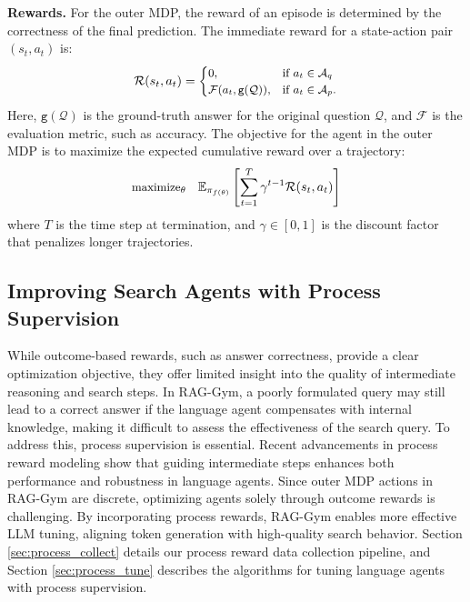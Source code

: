 \noindent \textbf{Rewards.} For the outer MDP, the reward of an episode is determined by the correctness of the final prediction. The immediate reward for a state-action pair \((s_t, a_t)\) is:
\begin{equation}\small
\mathcal{R}(s_t, a_t) = \begin{cases} 
0, & \text{if } a_t \in \mathcal{A}_q \\ 
\mathcal{F}(a_t, \mathtt{g}(\mathcal{Q})), & \text{if } a_t \in \mathcal{A}_p.
\end{cases}
\end{equation}
Here, \(\mathtt{g}(\mathcal{Q})\) is the ground-truth answer for the original question \(\mathcal{Q}\), and \(\mathcal{F}\) is the evaluation metric, such as accuracy.
The objective for the agent in the outer MDP is to maximize the expected cumulative reward over a trajectory:
\begin{equation}\small
\text{maximize}_{\theta} \quad \mathbb{E}_{\pi_{f(\theta)}}\left[\sum_{t=1}^{T} \gamma^{t-1}\mathcal{R}(s_t, a_t)\right]
\end{equation}
where \(T\) is the time step at termination, and \(\gamma \in [0, 1]\) is the discount factor that penalizes longer trajectories. 

\subsection{Improving Search Agents with Process Supervision}

While outcome-based rewards, such as answer correctness, provide a clear optimization objective, they offer limited insight into the quality of intermediate reasoning and search steps. In RAG-Gym, a poorly formulated query may still lead to a correct answer if the language agent compensates with internal knowledge, making it difficult to assess the effectiveness of the search query. To address this, process supervision is essential. Recent advancements in process reward modeling \citep{lightman2023let,wang2024math} show that guiding intermediate steps enhances both performance and robustness in language agents. Since outer MDP actions in RAG-Gym are discrete, optimizing agents solely through outcome rewards is challenging. By incorporating process rewards, RAG-Gym enables more effective LLM tuning, aligning token generation with high-quality search behavior. Section \ref{sec:process_collect} details our process reward data collection pipeline, and Section \ref{sec:process_tune} describes the algorithms for tuning language agents with process supervision.

